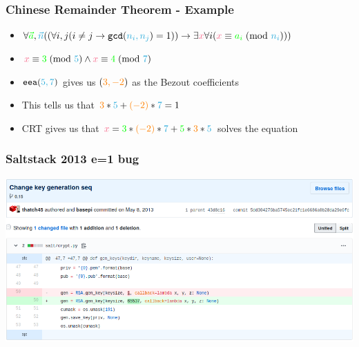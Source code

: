 \documentclass[aspectratio=169]{beamer}
\begin{document}
\begin{frame}[fragile]
\frametitle{Chinese Remainder Theorem - Example}
\begin{itemize}
\item $\forall {\color{green}\vec{a}}, {\color{cybercyan}\vec{n}}((\forall i,j(i \neq j \rightarrow \verb|gcd|({\color{cybercyan}n_i, n_j}) = 1)) \rightarrow \exists {\color{cyberpink}x} \forall i({\color{cyberpink}x} \equiv {\color{green}a_i}\hspace{1mm}(\text{mod }{\color{cybercyan}n_i})))$
\item ${\color{cyberpink}x} \equiv {\color{green}3} \hspace{1mm}(\text{mod } {\color{cybercyan}5}) \land {\color{cyberpink}x} \equiv {\color{green}4} \hspace{1mm}(\text{mod } {\color{cybercyan}7})$
\item $\verb|eea|({\color{cybercyan}5,7})$ gives us $({\color{orange}3, -2})$ as the Bezout coefficients
\item This tells us that ${\color{orange}3}*{\color{cybercyan}5} + {\color{orange}(-2)}*{\color{cybercyan}7} = 1$
\item CRT gives us that ${\color{cyberpink}x} = {\color{green}3} * {\color{orange}(-2)} * {\color{cybercyan}7} + {\color{green}5} * {\color{orange}3} * {\color{cybercyan}5}$ solves the equation
\end{itemize}
\end{frame}

\begin{frame}[fragile]
\frametitle{Saltstack 2013 e=1 bug}
\includegraphics[width=0.9\paperwidth]{saltstack_rsa_diff.png}
\end{frame}
\end{document}
